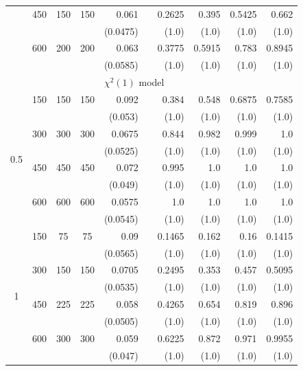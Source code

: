\begin{table}[htbp]
\begin{tabular}{ccccrrrrrr}
            & 450 & 150 & 150 & 0.061 &       & 0.2625 & 0.395 & 0.5425 & 0.662 \\
            &     &     &     & (0.0475) &       & (1.0) & (1.0) & (1.0) & (1.0) \\
            & 600 & 200 & 200 & 0.063 &       & 0.3775 & 0.5915 & 0.783 & 0.8945 \\
            &     &     &     & (0.0585) &       & (1.0) & (1.0) & (1.0) & (1.0) \\
            \midrule
        &   &     &     & \multicolumn{6}{l}{$\chi^2(1)$ model} \\
        \multirow{8}{*}{0.5}
            & 150 & 150 & 150 & 0.092 &       & 0.384 & 0.548 & 0.6875 & 0.7585 \\
            &     &     &     & (0.053) &       & (1.0) & (1.0) & (1.0) & (1.0) \\
            & 300 & 300 & 300 & 0.0675 &       & 0.844 & 0.982 & 0.999 & 1.0 \\
            &     &     &     & (0.0525) &       & (1.0) & (1.0) & (1.0) & (1.0) \\
            & 450 & 450 & 450 & 0.072 &       & 0.995 & 1.0 & 1.0 & 1.0 \\
            &     &     &     & (0.049) &       & (1.0) & (1.0) & (1.0) & (1.0) \\
            & 600 & 600 & 600 & 0.0575 &       & 1.0 & 1.0 & 1.0 & 1.0 \\
            &     &     &     & (0.0545) &       & (1.0) & (1.0) & (1.0) & (1.0) \\
            \midrule
        \multirow{8}{*}{1}
            & 150 & 75 & 75 & 0.09 &       & 0.1465 & 0.162 & 0.16 & 0.1415 \\
            &     &     &     & (0.0565) &       & (1.0) & (1.0) & (1.0) & (1.0) \\
            & 300 & 150 & 150 & 0.0705 &       & 0.2495 & 0.353 & 0.457 & 0.5095 \\
            &     &     &     & (0.0535) &       & (1.0) & (1.0) & (1.0) & (1.0) \\
            & 450 & 225 & 225 & 0.058 &       & 0.4265 & 0.654 & 0.819 & 0.896 \\
            &     &     &     & (0.0505) &       & (1.0) & (1.0) & (1.0) & (1.0) \\
            & 600 & 300 & 300 & 0.059 &       & 0.6225 & 0.872 & 0.971 & 0.9955 \\
            &     &     &     & (0.047) &       & (1.0) & (1.0) & (1.0) & (1.0) \\

\end{tabular}
\end{table}

